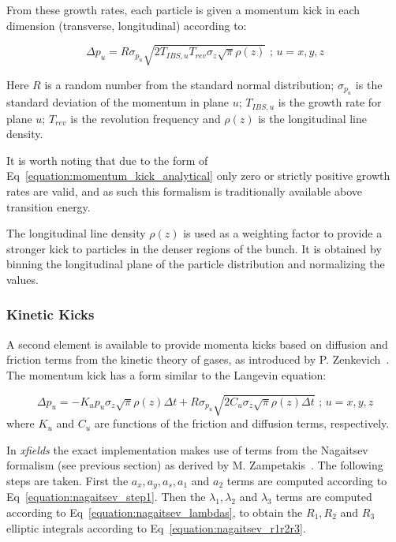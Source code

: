 From these growth rates, each particle is given a momentum kick in each dimension (transverse, longitudinal) according to:

\begin{equation}
    \boxed{\Delta p_u = R \sigma_{p_u} \sqrt{ 2 T_{IBS,u} T_{rev} \sigma_z \sqrt{\pi} \rho(z)} \text{ ;   } u=x,y,z}
    \label{equation:momentum_kick_analytical}
\end{equation}

Here \(R\) is a random number from the standard normal distribution; \(\sigma_{p_u}\) is the standard deviation of the momentum in plane \(u\); \(T_{IBS,u}\) is the growth rate for plane \(u\); \(T_{rev}\) is the revolution frequency and \(\rho(z)\) is the longitudinal line density.

It is worth noting that due to the form of Eq~\eqref{equation:momentum_kick_analytical} only zero or strictly positive growth rates are valid, and as such this formalism is traditionally available above transition energy.

The longitudinal line density \(\rho(z)\) is used as a weighting factor to provide a stronger kick to particles in the denser regions of the bunch.
It is obtained by binning the longitudinal plane of the particle distribution and normalizing the values.

\subsubsection{Kinetic Kicks}

A second element is available to provide momenta kicks based on diffusion and friction terms from the kinetic theory of gases, as introduced by P. Zenkevich~\cite{NuclInstr:Zenkevich:IBSKineticKick}.
The momentum kick has a form similar to the Langevin equation:

\begin{equation}
    \Delta p_u = - K_u p_u \sigma_z \sqrt{\pi} \rho(z) \Delta t + R \sigma_{p_u} \sqrt{2 C_u \sigma_z \sqrt{\pi} \rho(z) \Delta t} \text{ ;   } u=x,y,z
    \label{equation:original_kinetic_kick}
\end{equation}
where \(K_u\) and \(C_u\) are functions of the friction and diffusion terms, respectively.
\newline

In \textit{xfields} the exact implementation makes use of terms from the Nagaitsev formalism (see previous section) as derived by M. Zampetakis~\cite{arXiv:Zampetakis:Interplay_SC_IBS_LHC_Chain}.
The following steps are taken.
First the \(a_x, a_y, a_s, a_1\) and \(a_2\) terms are computed according to Eq~\eqref{equation:nagaitsev_step1}.
Then the \(\lambda_1, \lambda_2\) and \(\lambda_3\) terms are computed according to Eq~\eqref{equation:nagaitsev_lambdas}, to obtain the \(R_1, R_2\) and \(R_3\) elliptic integrals according to Eq~\eqref{equation:nagaitsev_r1r2r3}.

